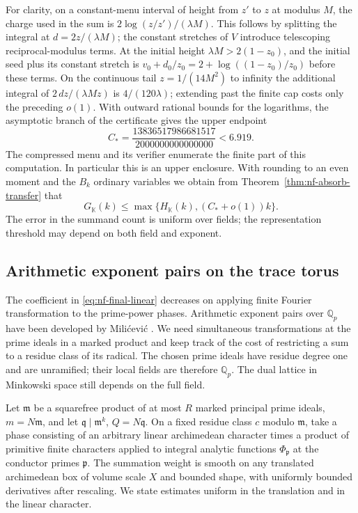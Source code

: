 \documentclass[11pt,letterpaper]{article}
\theoremstyle{definition}
\numberwithin{equation}{section}
\begin{document}
For clarity, on a constant-menu interval of height from $z'$ to
$z$ at modulus $M$, the charge used in the sum is
$2\log(z/z')/(\lambda M)$. This follows by splitting the integral
at $d=2z/(\lambda M)$; the constant stretches of $V$ introduce
telescoping reciprocal-modulus terms. At the initial height
$\lambda M>2(1-z_0)$, and the initial seed plus its constant stretch
is $v_0+d_0/z_0=2+\log((1-z_0)/z_0)$ before these terms. On the
continuous tail $z=1/(14M^2)$ to infinity the additional integral
of $2\,dz/(\lambda Mz)$ is $4/(120\lambda)$; extending past the
finite cap costs only the preceding $o(1)$. With outward rational
bounds for the logarithms, the asymptotic branch of the certificate
gives the upper endpoint
\[
 C_* =\frac{13836517986681517}{2000000000000000}<6.919 .
\]
The compressed menu and its verifier enumerate the finite part of
this computation. In particular this is an upper enclosure. With
rounding to an even moment and the $B_k$ ordinary variables we obtain
from Theorem~\ref{thm:nf-absorb-transfer} that
\begin{equation}\label{eq:nf-final-linear}
       G_{\mathbb K}(k)\le
       \max\{H_{\mathbb K}(k),(C_*+o(1))k\}.
\end{equation}
The error in the summand count is uniform over fields; the
representation threshold may depend on both field and exponent.

\subsection{Arithmetic exponent pairs on the trace torus}
\label{sec:nf-arith-pairs}

The coefficient in \eqref{eq:nf-final-linear} decreases on applying
finite Fourier transformation to the prime-power phases. Arithmetic
exponent pairs over $\mathbb Q_p$ have been developed by
Mili\'cevi\'c \cite{NFMili}. We need simultaneous transformations at the
prime ideals in a marked product and keep track of the cost of
restricting a sum to a residue class of its radical. The chosen
prime ideals have residue degree one and are unramified; their local
fields are therefore $\mathbb Q_p$. The dual lattice in Minkowski
space still depends on the full field.

Let $\mathfrak m$ be a squarefree product of at most $R$ marked
principal prime ideals, $m=N\mathfrak m$, and let
$\mathfrak q\mid\mathfrak m^k$, $Q=N\mathfrak q$. On a fixed
residue class $c$ modulo $\mathfrak m$, take a phase consisting
of an arbitrary linear archimedean character times a product of
primitive finite characters applied to integral analytic functions
$\Phi_{\mathfrak p}$ at the conductor primes $\mathfrak p$.
The summation weight is smooth on any translated archimedean box
of volume scale $X$ and bounded shape, with uniformly bounded
derivatives after rescaling. We state estimates uniform in the
translation and in the linear character.
\end{document}
